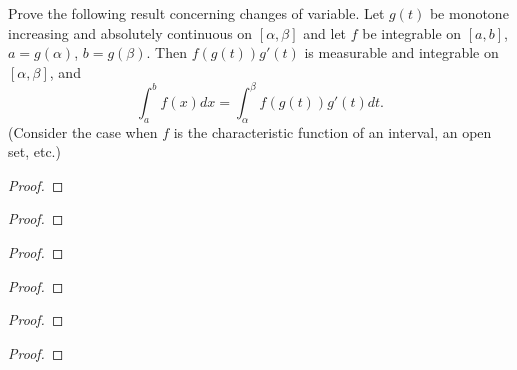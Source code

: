 
\begin{problem}
Prove the following result concerning changes of variable. Let $g(t)$ be
monotone increasing and absolutely continuous on $[\alpha,\beta]$ and let $f$
be integrable on $[a,b]$, $a= g(\alpha)$, $b=
g(\beta)$. Then $f(g(t))g'(t)$ is measurable and integrable on
$[\alpha,\beta]$, and
\[
\int_a^b f(x)d x=\int_\alpha^\beta f(g(t))g'(t)d t.
\]
(Consider the case when $f$ is the characteristic function of an interval,
an open set, etc.)
\end{problem}
\begin{proof}
\end{proof}

\begin{problem}
\end{problem}
\begin{proof}
\end{proof}
\newpage

\begin{problem}
\end{problem}
\begin{proof}
\end{proof}
\newpage

\begin{problem}
\end{problem}
\begin{proof}
\end{proof}
\newpage

\begin{problem}
\end{problem}
\begin{proof}
\end{proof}
\newpage

\begin{problem}
\end{problem}
\begin{proof}
\end{proof}

